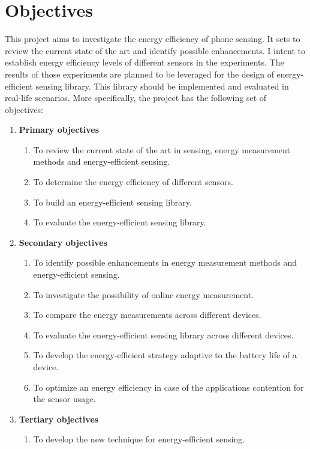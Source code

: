 \section{Objectives}
\label{s:objectives}
\hspace{10pt} This project aims to investigate the energy efficiency of phone sensing. It sets to review the current state of the art and identify possible enhancements. I intent to establish energy efficiency levels of different sensors in the experiments. The results of those experiments are planned to be leveraged for the design of energy-efficient sensing library. This library should be implemented and evaluated in real-life scenarios. More specifically, the project has the following set of objectives: 

\begin{enumerate}
 \item \textbf{Primary objectives}
  \begin{enumerate}
  	\item \label{o:survey:review}To review the current state of the art in sensing, energy measurement methods and energy-efficient sensing.
  	\item \label{o:measurements:primary}To determine the energy efficiency of different sensors.
  	\item \label{o:library:build}To build an energy-efficient sensing library.
  	\item \label{o:library:eval}To evaluate the energy-efficient sensing library.
  \end{enumerate}
  \item \textbf{Secondary objectives}
  \begin{enumerate}
  	\item \label{o:survey:enhancements}To identify possible enhancements in energy measurement methods and energy-efficient sensing.
    \item \label{o:measurements:online}To investigate the possibility of online energy measurement.
    \item \label{o:measurements:devices}To compare the energy measurements across different devices.
    \item \label{o:library:devices}To evaluate the energy-efficient sensing library across different devices.
    \item \label{o:library:battery}To develop the energy-efficient strategy adaptive to the battery life of a device.
    \item \label{o:library:apps}To optimize an energy efficiency in case of the applications contention for the sensor usage.
  \end{enumerate}
  \item \textbf{Tertiary objectives}
  \begin{enumerate}
   \item \label{o:library:original}To develop the new technique for energy-efficient sensing.
  \end{enumerate}
\end{enumerate}